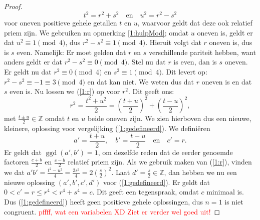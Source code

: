 \documentclass[12pt,reqno]{article}
\newcommand*{\ZZ}{\ensuremath{\mathbb{Z}}}
\theoremstyle{theorem}
\theoremstyle{definition}
\DeclareMathOperator{\ggd}{ggd}
\begin{document}
\begin{proof}
		\begin{equation}\label{1:r}
			t^2 = r^2 + s^2 \quad \text{en} \quad u^2 = r^2 - s^2
		\end{equation}
		voor oneven positieve gehele getallen $t$ en $u$, waarvoor geldt dat deze ook relatief priem zijn. We gebruiken nu opmerking \ref{1:hulpMod}; omdat $u$ oneven is, geldt er dat $u^2 \equiv 1 \pmod{4}$, dus $r^2 - s^2 \equiv 1 \pmod{4}$. Hieruit volgt dat $r$ oneven is, dus is $s$ even. Namelijk: Er moet gelden dat $r$ en $s$ verschillende pariteit hebben, want anders geldt er dat $r^2 - s^2 \equiv 0 \pmod{4}$. Stel nu dat $r$ is even, dan is $s$ oneven. Er geldt nu dat $r^2 \equiv 0 \pmod{4}$ en $s^2 \equiv 1 \pmod{4}$. Dit levert op: $r^2 - s^2 \equiv -1 \equiv 3 \pmod{4}$ en dat kan niet. We weten dus dat $r$ oneven is en dat $s$ even is. Nu lossen we  (\ref{1:r}) op voor $r^2$. Dit geeft ons:
		\begin{equation*}
			r^2 = \frac{t^2 + u^2}{2} = \left( \frac{t+u}{2} \right)^2 + \left( \frac{t-u}{2} \right)^2,
		\end{equation*}
		met $\frac{t \pm u}{2} \in\ZZ$ omdat $t$ en $u$ beide oneven zijn. We zien hierboven dus een nieuwe, kleinere, oplossing voor vergelijking (\ref{1:gedefineerd}). We defini\"eren
		\begin{equation*}
			a' = \frac{t+u}{2}, \quad b' = \frac{t-u}{2} \quad \text{en} \quad c' = r.
		\end{equation*}
		Er geldt dat $\ggd(a',b') = 1$, om dezelfde reden dat de eerder genoemde factoren $\frac{c+b}{2}$ en $\frac{c-b}{2}$ relatief priem zijn. Als we gebruik maken van (\ref{1:r}), vinden we dat $a'b' = \frac{t^2 - u^2}{4} = \frac{2s^2}{4} = 2\left( \frac{s}{2} \right)^2$. Laat $d' = \frac{s}{2} \in\ZZ$, dan hebben we nu een nieuwe oplossing $(a', b', c', d')$ voor (\ref{1:gedefineerd}). Er geldt dat $0 < c'= r \leq r^4 < r^4 + s^4 = c$. Dit geeft een tegenspraak, omdat $c$ minimaal is. Dus (\ref{1:gedefineerd}) heeft geen positieve gehele oplossingen, dus $n=1$ is niet congruent.
		\textcolor{red}{pffff, wat een variabelen XD Ziet er verder wel goed uit!}
	\end{proof}
\end{document}
